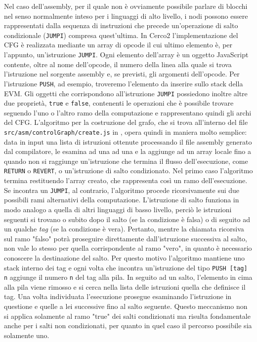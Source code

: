 \documentclass[12pt,a4paper,openright,oneside]{report}
\theoremstyle{definition}
\begin{document}
Nel caso dell'assembly, per il quale non \`{e} ovviamente possibile parlare di blocchi nel senso normalmente inteso per i linguaggi di alto livello, i nodi possono essere rappresentati dalla sequenza di instruzioni che precede un'operazione di salto condizionale (\texttt{JUMPI}) compresa quest'ultima. In Cerco2 l'implementazione del CFG \`{e} realizzata mediante un array di opcode il cui ultimo elemento \`{e}, per l'appunto, un'istruzione \texttt{JUMPI}. Ogni elemento dell'array \`{e} un oggetto JavaScript contente, oltre al nome dell'opcode, il numero della linea alla quale si trova l'istruzione nel sorgente assembly e, se previsti, gli argomenti dell'opcode. Per l'istruzione \texttt{PUSH}, ad esempio, troveremo l'elemento da inserire sullo stack della EVM. Gli oggetti che corrispondono all'istruzione \texttt{JUMPI} possiedono inoltre altre due propriet\`{a}, \texttt{true} e \texttt{false}, contenenti le operazioni che \`{e} possibile trovare seguendo l'uno o l'altro ramo della computazione e rappresentano quindi gli archi del CFG. L'algoritmo per la costruzione del grafo, che si trova all'interno del file \texttt{src/asm/controlGraph/create.js} in \cite{repo_thesis}, opera quindi in maniera molto semplice: data in input una lista di istruzioni ottenute processando il file assembly generato dal compilatore, le esamina ad una ad una e la aggiunge ad un array locale fino a quando non si raggiunge un'istruzione che termina il flusso dell'esecuzione, come \texttt{RETURN} o \texttt{REVERT}, o un'istruzione di salto condizionato. Nel primo caso l'algoritmo termina restituendo l'array creato, che rappresenta cos\`{i} un ramo dell'esecuzione. Se incontra un \texttt{JUMPI}, al contrario, l'algoritmo procede ricorsivamente sui due possibili rami alternativi della computazione. L'istruzione di salto funziona in modo analogo a quella di altri linguaggi di basso livello, perci\`{o} le istruzioni seguenti si trovano o subito dopo il salto (se la condizione \`{e} falsa) o di seguito ad un qualche \textit{tag} (se la condizione \`{e} vera). Pertanto, mentre la chiamata ricorsiva sul ramo "falso" potr\`{a} proseguire direttamente dall'istruzione successiva al salto, non vale lo stesso per quella corrispondente al ramo "vero", in quanto \`{e} necessario conoscere la destinazione del salto. Per questo motivo l'algoritmo mantiene uno stack interno dei tag e ogni volta che incontra un'istruzione del tipo \texttt{PUSH [tag] n} aggiunge il numero \texttt{n} del tag alla pila. In seguito ad un salto, l'elemento in cima alla pila viene rimosso e si cerca nella lista delle istruzioni quella che definisce il tag. Una volta individuata l'esecuzione prosegue esaminando l'istruzione in questione e quelle a lei successive fino al salto seguente. Questo meccanismo non si applica solamente al ramo "true" dei salti condizionati ma risulta fondamentale anche per i salti non condizionati, per quanto in quel caso il percorso possibile sia solamente uno.\\
\end{document}
